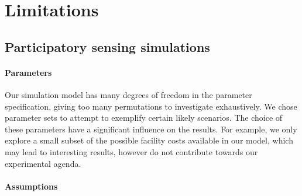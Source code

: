 


\section{Limitations}

\subsection{Participatory sensing simulations}

\paragraph{Parameters} Our simulation model has many degrees of freedom in the
parameter specification, giving too many permutations to investigate
exhaustively. We chose parameter sets to attempt to exemplify certain likely
scenarios. The choice of these parameters have a significant influence on the
results. For example, we only explore a small subset of the possible facility costs
available in our model, which may lead to interesting results, however do not
contribute towards our experimental agenda.

\paragraph{Assumptions}

